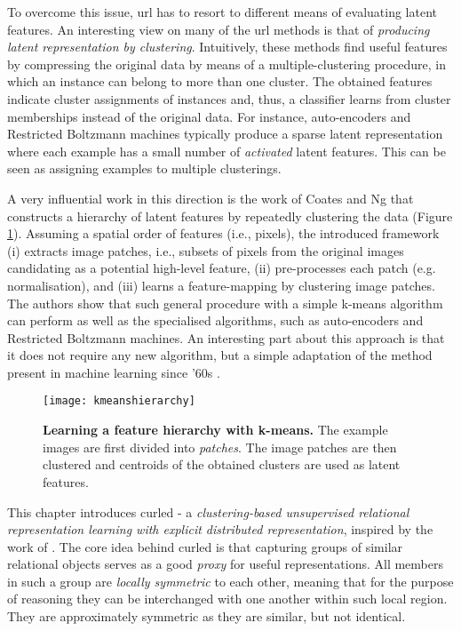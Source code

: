 To overcome this issue, \gls{url} has to resort to different means of evaluating latent features.
An interesting view on many of the \gls{url} methods is that of \textit{producing latent representation by clustering}.
Intuitively, these methods find useful features by compressing the original data by means of a  multiple-clustering procedure, in which an instance can belong to more than one cluster.
The obtained features indicate cluster assignments of instances and, thus, a classifier learns from cluster memberships instead of the original data.
For instance, auto-encoders and Restricted Boltzmann machines typically produce a sparse latent representation where each example has a small number of \textit{activated} latent features.
This can be seen as assigning examples to multiple clusterings.


A very influential work in this direction is the work of Coates and Ng \cite{coates2011analysis} that constructs a hierarchy of latent features by repeatedly clustering the data  (Figure \ref{fig:kmeansh}).
Assuming a spatial order of features (i.e., pixels), the introduced framework (i) extracts image patches, i.e., subsets of pixels from the original images candidating as a potential high-level feature, (ii) pre-processes each patch (e.g. normalisation), and (iii) learns a feature-mapping by clustering image patches.
The authors show that such general procedure with a simple k-means algorithm can perform as well as the specialised algorithms, such as auto-encoders and  Restricted Boltzmann machines.
An interesting part about this approach is that it does not require any new algorithm, but a simple adaptation of the method present in machine learning since '60s \cite{kmeans}.





\begin{figure}
	\medskip
	\centering
	\texttt{[image: kmeanshierarchy]}
	\caption[Learning a feature hierarchy with k-means]{\textbf{Learning a feature hierarchy with k-means.} The example images are first divided into \textit{patches}. The image patches are then clustered and centroids of the obtained clusters are used as latent features.}
	\label{fig:kmeansh}
\end{figure}



This chapter introduces \gls{curled} - a \textit{clustering-based unsupervised relational representation learning with explicit distributed representation}, inspired by the work of \cite{coates2011analysis}.
The core idea behind \gls{curled} is that capturing groups of similar relational objects serves as a good \textit{proxy} for useful representations.
All members in such a group are \textit{locally symmetric} to each other, meaning that for the purpose of reasoning they can be interchanged with one another within such local region.
They are approximately symmetric as they are similar, but not identical.



